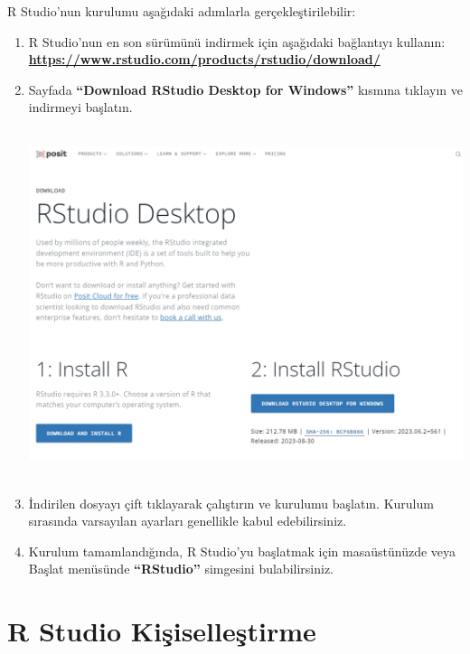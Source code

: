 \documentclass[
  letterpaper,
  DIV=11,
  numbers=noendperiod]{scrreprt}
\begin{document}
R Studio'nun kurulumu aşağıdaki adımlarla gerçekleştirilebilir:

\begin{enumerate}
\def\labelenumi{\arabic{enumi}.}
\item
  R Studio'nun en son sürümünü indirmek için aşağıdaki bağlantıyı
  kullanın:
  \href{https://www.rstudio.com/products/rstudio/download/}{\textbf{https://www.rstudio.com/products/rstudio/download/}}
\item
  Sayfada \textbf{``Download RStudio Desktop for Windows''} kısmına
  tıklayın ve indirmeyi başlatın.

  \includegraphics[width=6.625in,height=4.02083in]{images/R Studio.PNG}
\item
  İndirilen dosyayı çift tıklayarak çalıştırın ve kurulumu başlatın.
  Kurulum sırasında varsayılan ayarları genellikle kabul edebilirsiniz.
\item
  Kurulum tamamlandığında, R Studio'yu başlatmak için masaüstünüzde veya
  Başlat menüsünde \textbf{``RStudio''} simgesini bulabilirsiniz.
\end{enumerate}

\hypertarget{r-studio-kiux15fiselleux15ftirme}{%
\section*{R Studio
Kişiselleştirme}\label{r-studio-kiux15fiselleux15ftirme}}

\end{document}
